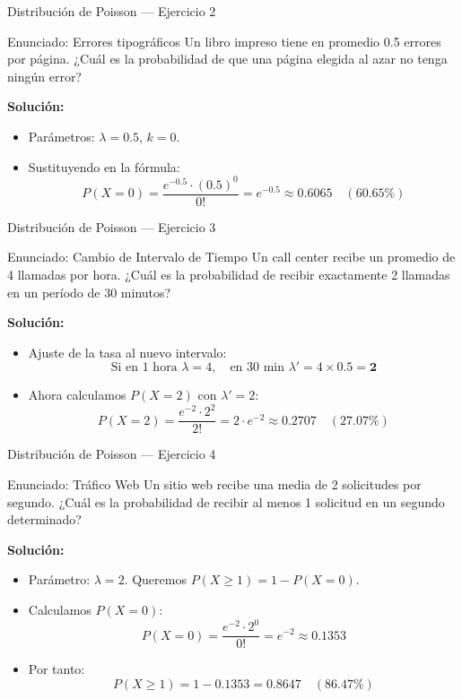 \documentclass[aspectratio=169, 10pt]{beamer}
\begin{document}
\begin{frame}{Distribución de Poisson — Ejercicio 2}
    \begin{exampleblock}{Enunciado: Errores tipográficos}
        Un libro impreso tiene en promedio 0.5 errores por página. ¿Cuál es la probabilidad de que una página elegida al azar no tenga ningún error?
    \end{exampleblock}
     \pause
    \textbf{Solución:}
    \begin{itemize}
        \item Parámetros: $\lambda = 0.5$, $k = 0$.
        \item Sustituyendo en la fórmula:
        $$P(X = 0) = \frac{e^{-0.5} \cdot (0.5)^0}{0!} = e^{-0.5} \approx \mathbf{0.6065} \quad (60.65\%)$$
    \end{itemize}
\end{frame}

\begin{frame}{Distribución de Poisson — Ejercicio 3}
    \begin{exampleblock}{Enunciado: Cambio de Intervalo de Tiempo}
        Un call center recibe un promedio de 4 llamadas por hora. ¿Cuál es la probabilidad de recibir exactamente 2 llamadas en un período de 30 minutos?
    \end{exampleblock}
     \pause
    \textbf{Solución:}
    \begin{itemize}
        \item Ajuste de la tasa al nuevo intervalo:
        $$\text{Si en 1 hora } \lambda = 4, \quad \text{en 30 min } \lambda' = 4 \times 0.5 = \mathbf{2}$$
        \item Ahora calculamos $P(X = 2)$ con $\lambda' = 2$:
        $$P(X = 2) = \frac{e^{-2} \cdot 2^2}{2!} = 2 \cdot e^{-2} \approx \mathbf{0.2707} \quad (27.07\%)$$
    \end{itemize}
\end{frame}

\begin{frame}{Distribución de Poisson — Ejercicio 4}
    \begin{exampleblock}{Enunciado: Tráfico Web}
        Un sitio web recibe una media de 2 solicitudes por segundo. ¿Cuál es la probabilidad de recibir al menos 1 solicitud en un segundo determinado?
    \end{exampleblock}
     \pause
    \textbf{Solución:}
    \begin{itemize}
        \item Parámetro: $\lambda = 2$. Queremos $P(X \ge 1) = 1 - P(X = 0)$.
        \item Calculamos $P(X = 0)$:
        $$P(X = 0) = \frac{e^{-2} \cdot 2^0}{0!} = e^{-2} \approx 0.1353$$
        \item Por tanto:
        $$P(X \ge 1) = 1 - 0.1353 = \mathbf{0.8647} \quad (86.47\%)$$
    \end{itemize}
\end{frame}
\end{document}
